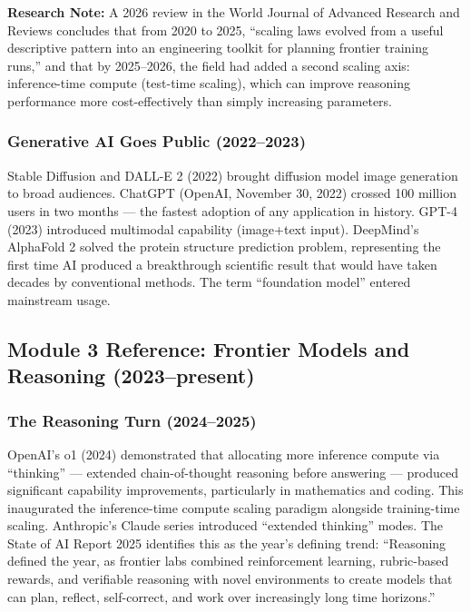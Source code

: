 \documentclass[11pt,letterpaper]{article}
\begin{document}
\textbf{Research Note:} A 2026 review in the World Journal of Advanced Research and Reviews concludes that from 2020 to 2025, ``scaling laws evolved from a useful descriptive pattern into an engineering toolkit for planning frontier training runs,'' and that by 2025--2026, the field had added a second scaling axis: inference-time compute (test-time scaling), which can improve reasoning performance more cost-effectively than simply increasing parameters.

\subsubsection{Generative AI Goes Public (2022--2023)}

Stable Diffusion and DALL-E 2 (2022) brought diffusion model image generation to broad audiences. ChatGPT (OpenAI, November 30, 2022) crossed 100 million users in two months --- the fastest adoption of any application in history. GPT-4 (2023) introduced multimodal capability (image+text input). DeepMind's AlphaFold 2 solved the protein structure prediction problem, representing the first time AI produced a breakthrough scientific result that would have taken decades by conventional methods. The term ``foundation model'' entered mainstream usage.

\subsection{Module 3 Reference: Frontier Models and Reasoning (2023--present)}

\subsubsection{The Reasoning Turn (2024--2025)}

OpenAI's o1 (2024) demonstrated that allocating more inference compute via ``thinking'' --- extended chain-of-thought reasoning before answering --- produced significant capability improvements, particularly in mathematics and coding. This inaugurated the inference-time compute scaling paradigm alongside training-time scaling. Anthropic's Claude series introduced ``extended thinking'' modes. The State of AI Report 2025 identifies this as the year's defining trend: ``Reasoning defined the year, as frontier labs combined reinforcement learning, rubric-based rewards, and verifiable reasoning with novel environments to create models that can plan, reflect, self-correct, and work over increasingly long time horizons.''
\end{document}
